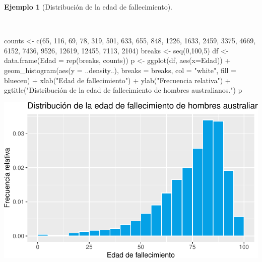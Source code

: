 \documentclass[
  a4paper,
]{scrreport}
\newenvironment{Shaded}{\begin{snugshade}}{\end{snugshade}}
\newcommand{\AttributeTok}[1]{\textcolor[rgb]{0.40,0.45,0.13}{#1}}
\newcommand{\DecValTok}[1]{\textcolor[rgb]{0.68,0.00,0.00}{#1}}
\newcommand{\FunctionTok}[1]{\textcolor[rgb]{0.28,0.35,0.67}{#1}}
\newcommand{\NormalTok}[1]{\textcolor[rgb]{0.00,0.23,0.31}{#1}}
\newcommand{\OtherTok}[1]{\textcolor[rgb]{0.00,0.23,0.31}{#1}}
\newcommand{\SpecialCharTok}[1]{\textcolor[rgb]{0.37,0.37,0.37}{#1}}
\newcommand{\StringTok}[1]{\textcolor[rgb]{0.13,0.47,0.30}{#1}}
\theoremstyle{plain}
\theoremstyle{definition}
\newtheorem{example}{Ejemplo}[chapter]
\theoremstyle{definition}
\theoremstyle{remark}
\begin{document}
\begin{example}[Distribución de la edad de
fallecimiento]\protect\hypertarget{exm-distribucion-edad-fallecimiento}{}\label{exm-distribucion-edad-fallecimiento}

~

\begin{Shaded}
\begin{Highlighting}[]
\NormalTok{counts }\OtherTok{\textless{}{-}} \FunctionTok{c}\NormalTok{(}\DecValTok{65}\NormalTok{, }\DecValTok{116}\NormalTok{, }\DecValTok{69}\NormalTok{, }\DecValTok{78}\NormalTok{, }\DecValTok{319}\NormalTok{, }\DecValTok{501}\NormalTok{, }\DecValTok{633}\NormalTok{, }\DecValTok{655}\NormalTok{, }\DecValTok{848}\NormalTok{, }\DecValTok{1226}\NormalTok{, }\DecValTok{1633}\NormalTok{, }\DecValTok{2459}\NormalTok{, }\DecValTok{3375}\NormalTok{, }\DecValTok{4669}\NormalTok{, }\DecValTok{6152}\NormalTok{, }\DecValTok{7436}\NormalTok{, }\DecValTok{9526}\NormalTok{, }\DecValTok{12619}\NormalTok{, }\DecValTok{12455}\NormalTok{, }\DecValTok{7113}\NormalTok{, }\DecValTok{2104}\NormalTok{)}
\NormalTok{breaks }\OtherTok{\textless{}{-}} \FunctionTok{seq}\NormalTok{(}\DecValTok{0}\NormalTok{,}\DecValTok{100}\NormalTok{,}\DecValTok{5}\NormalTok{)}
\NormalTok{df }\OtherTok{\textless{}{-}} \FunctionTok{data.frame}\NormalTok{(}\AttributeTok{Edad =} \FunctionTok{rep}\NormalTok{(breaks, counts))}
\NormalTok{p }\OtherTok{\textless{}{-}} \FunctionTok{ggplot}\NormalTok{(df, }\FunctionTok{aes}\NormalTok{(}\AttributeTok{x=}\NormalTok{Edad)) }\SpecialCharTok{+}
    \FunctionTok{geom\_histogram}\NormalTok{(}\FunctionTok{aes}\NormalTok{(}\AttributeTok{y =}\NormalTok{ ..density..), }\AttributeTok{breaks =}\NormalTok{ breaks, }\AttributeTok{col =} \StringTok{"white"}\NormalTok{, }\AttributeTok{fill =}\NormalTok{ blueceu) }\SpecialCharTok{+}
    \FunctionTok{xlab}\NormalTok{(}\StringTok{"Edad de fallecimiento"}\NormalTok{) }\SpecialCharTok{+}
    \FunctionTok{ylab}\NormalTok{(}\StringTok{"Frecuencia relativa"}\NormalTok{) }\SpecialCharTok{+}
    \FunctionTok{ggtitle}\NormalTok{(}\StringTok{"Distribución de la edad de fallecimiento de hombres australianos."}\NormalTok{)}
\NormalTok{p}
\end{Highlighting}
\end{Shaded}

\includegraphics{02-estadistica-descriptiva_files/figure-pdf/histograma-edad-fallecimiento-1.pdf}

\end{example}
\end{document}
